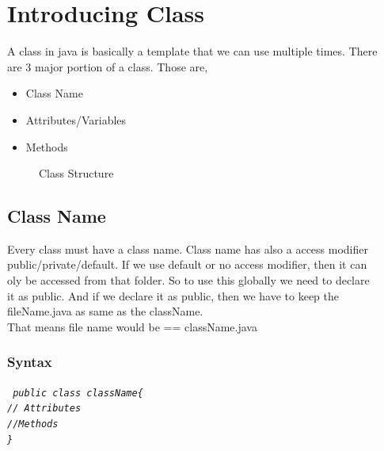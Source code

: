 \documentclass[openany]{book}  %
\begin{document}
\section{Introducing Class}
A class in java is basically a template that we can use multiple times. There \\
are 3 major portion of a class. Those are,
\begin{itemize}
    \item Class Name
    \item Attributes/Variables
    \item Methods
\end{itemize}
% 
% 
\begin{figure}[htbp]
    \begin{center}
        \caption{Class Structure}
    \end{center}
\end{figure}
% 
% 
\subsection{Class Name}
Every class must have a class name. Class name has also a access modifier \\
public/private/default. If we use default or no access modifier, then it can \\
oly be accessed from that folder. So to use this globally we need to declare \\
it as public. And if we declare it as public, then we have to keep the \\
fileName.java as same as the className. \\
That means file name would be == className.java
% 
%
\subsubsection{Syntax}
\begin{center}
    \raggedright
    \tt{
        \textit{
            \quad\quad\quad\quad\quad\quad\quad\quad\quad\quad\quad\quad\quad public class className\{ \\
            \quad\quad\quad\quad\quad\quad\quad\quad\quad\quad\quad\quad\quad\quad\quad // Attributes \\
            \quad\quad\quad\quad\quad\quad\quad\quad\quad\quad\quad\quad\quad\quad\quad //Methods \\
            \quad\quad\quad\quad\quad\quad\quad\quad\quad\quad\quad\quad\quad \}
        }
    }
\end{center}
% 
% 
\end{document}
